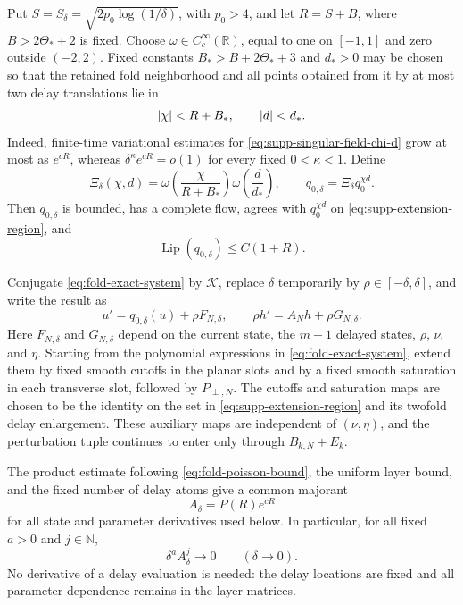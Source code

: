 Put \(S=S_\delta=\sqrt{2p_0\log(1/\delta)}\), with \(p_0>4\), and let
\(R=S+B\), where \(B>2\Theta_*+2\) is fixed.  Choose
\(\omega\in C_c^\infty(\mathbb R)\), equal to one on \([-1,1]\) and
zero outside \((-2,2)\).  Fixed constants \(B_*>B+2\Theta_*+3\) and
\(d_*>0\) may be chosen so that the retained fold neighborhood and all points obtained
from it by at most two delay translations lie in
\begin{equation}
 \left\lvert\chi\right\rvert<R+B_* ,\qquad \left\lvert d\right\rvert<d_*.
 \label{eq:supp-extension-region}
\end{equation}
Indeed, finite-time variational estimates for
\eqref{eq:supp-singular-field-chi-d} grow at most as \(e^{cR}\), whereas
\(\delta^\kappa e^{cR}=o(1)\) for every fixed \(0<\kappa<1\).
Define
\begin{equation}
 \Xi_\delta(\chi,d)
 =\omega\!\left(\frac{\chi}{R+B_*}\right)
  \omega\!\left(\frac d{d_*}\right),\qquad
 q_{0,\delta}=\Xi_\delta q_0^{\chi d}.
 \label{eq:supp-global-singular-field}
\end{equation}
Then \(q_{0,\delta}\) is bounded, has a complete flow, agrees with
\(q_0^{\chi d}\) on \eqref{eq:supp-extension-region}, and
\begin{equation}
 \operatorname{Lip}(q_{0,\delta})\le C(1+R).
 \label{eq:supp-singular-lipschitz}
\end{equation}

Conjugate \cref{eq:fold-exact-system} by \(\mathcal K\), replace
\(\delta\) temporarily by \(\rho\in[-\delta,\delta]\), and write the
result as
\begin{equation}
 u'=q_{0,\delta}(u)+\rho F_{N,\delta},\qquad
 \rho h'=A_Nh+\rho G_{N,\delta}.
 \label{eq:supp-extended-normal-form}
\end{equation}
Here \(F_{N,\delta}\) and \(G_{N,\delta}\) depend on the current state,
the \(m+1\) delayed states, \(\rho\), \(\nu\), and \(\eta\).  Starting
from the polynomial expressions in \cref{eq:fold-exact-system}, extend
them by fixed smooth cutoffs in the planar slots and by a fixed smooth
saturation in each transverse slot, followed by \(P_{\perp,N}\).  The
cutoffs and saturation maps are chosen to be the identity on the set in
\eqref{eq:supp-extension-region} and its twofold delay enlargement.  These
auxiliary maps are independent of \((\nu,\eta)\), and the perturbation tuple
continues to enter only through \(B_{k,N}+E_k\).

The product estimate following \cref{eq:fold-poisson-bound}, the uniform
layer bound, and the fixed number of delay atoms give a common majorant
\begin{equation}
 A_\delta=P(R)e^{cR}
 \label{eq:supp-global-majorant}
\end{equation}
for all state and parameter derivatives used below.  In particular, for
all fixed \(a>0\) and \(j\in\mathbb N\),
\begin{equation}
 \delta^aA_\delta^j\longrightarrow0
 \qquad(\delta\to0).
 \label{eq:supp-subpower-property}
\end{equation}
No derivative of a delay evaluation is needed: the delay locations are
fixed and all parameter dependence remains in the layer matrices.

